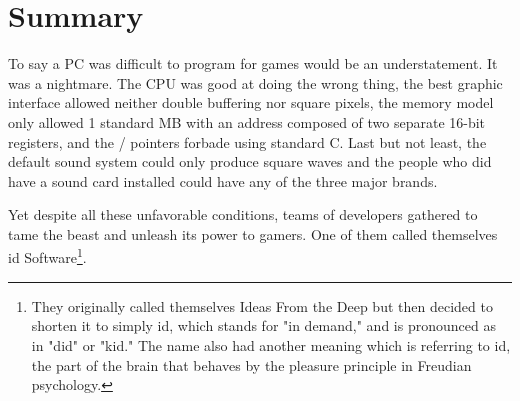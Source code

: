 \documentclass[book.tex]{subfiles}
\begin{document}
\section{Summary}
To say a PC was difficult to program for games would be an understatement. It was a nightmare. The CPU was good at doing the wrong thing, the best graphic interface allowed neither double buffering nor square pixels, the memory model only allowed 1 standard MB with an address composed of two separate 16-bit registers, and the / pointers forbade using standard C. Last but not least, the default sound system could only produce square waves and the people who did have a sound card installed could have any of the three major brands.\\
\par
Yet despite all these unfavorable conditions, teams of developers gathered to tame the beast and unleash its power to gamers. One of them called themselves id Software\footnote{They originally called themselves Ideas From the Deep but then decided to shorten it to simply id, which stands for "in demand," and is pronounced as in "did" or "kid." The name also had another meaning which is referring to id, the part of the brain that behaves by the pleasure principle in Freudian psychology.}.
\end{document}
